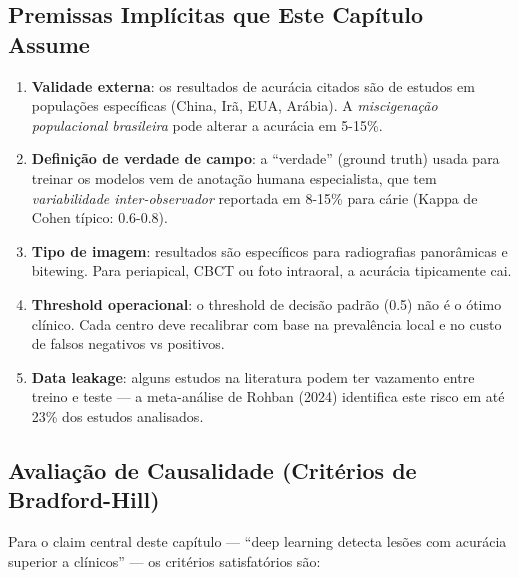 
\subsection*{Premissas Implícitas que Este Capítulo Assume}

\begin{enumerate}
    \item \textbf{Validade externa}: os resultados de acurácia
    citados são de estudos em populações específicas
    (China, Irã, EUA, Arábia). A \emph{miscigenação populacional brasileira}
    pode alterar a acurácia em 5-15\%.
    \item \textbf{Definição de verdade de campo}: a ``verdade''
    (ground truth) usada para treinar os modelos vem de anotação humana
    especialista, que tem \emph{variabilidade inter-observador}
    reportada em 8-15\% para cárie (Kappa de Cohen típico: 0.6-0.8).
    \item \textbf{Tipo de imagem}: resultados são específicos para
    radiografias panorâmicas e bitewing. Para periapical, CBCT ou
    foto intraoral, a acurácia tipicamente cai.
    \item \textbf{Threshold operacional}: o threshold de decisão
    padrão (0.5) não é o ótimo clínico. Cada centro deve recalibrar
    com base na prevalência local e no custo de falsos negativos vs
    positivos.
    \item \textbf{Data leakage}: alguns estudos na literatura
    podem ter vazamento entre treino e teste --- a meta-análise
    de Rohban (2024) \cite{rohban2024} identifica este risco em
    até 23\% dos estudos analisados.
\end{enumerate}

\subsection*{Avaliação de Causalidade (Critérios de Bradford-Hill)}


Para o claim central deste capítulo --- ``deep learning detecta
lesões com acurácia superior a clínicos'' --- os critérios
satisfatórios são:

